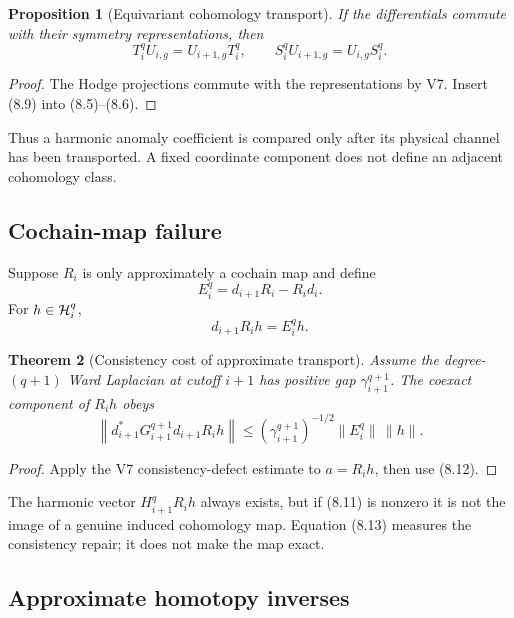 \documentclass[11pt]{article}
\newtheorem{theorem}{Theorem}[section]
\newtheorem{proposition}[theorem]{Proposition}
\theoremstyle{remark}
\begin{document}
\begin{proposition}[Equivariant cohomology transport]
\label{prop:v12v8-equivariant}
If the differentials commute with their symmetry representations,
then
\[
                         T_i^qU_{i,g}=U_{i+1,g}T_i^q,\qquad
                         S_i^qU_{i+1,g}=U_{i,g}S_i^q.        \tag{8.10}
\]
\end{proposition}

\begin{proof}
The Hodge projections commute with the representations by V7.
Insert (8.9) into (8.5)--(8.6).
\end{proof}

Thus a harmonic anomaly coefficient is compared only after its
physical channel has been transported.  A fixed coordinate component
does not define an adjacent cohomology class.

\subsection{Cochain-map failure}

Suppose \(R_i\) is only approximately a cochain map and define
\[
                              E_i^q=d_{i+1}R_i-R_id_i.        \tag{8.11}
\]
For \(h\in{\cal H}_i^q\),
\[
                              d_{i+1}R_ih=E_i^qh.            \tag{8.12}
\]

\begin{theorem}[Consistency cost of approximate transport]
\label{thm:v12v8-map-defect}
Assume the degree-\((q+1)\) Ward Laplacian at cutoff \(i+1\) has
positive gap \(\gamma_{i+1}^{q+1}\).  The coexact component of
\(R_ih\) obeys
\[
 \left\|
 d_{i+1}^*G_{i+1}^{q+1}d_{i+1}R_ih
 \right\|
 \le(\gamma_{i+1}^{q+1})^{-1/2}
       \|E_i^q\|\,\|h\|.                                    \tag{8.13}
\]
\end{theorem}

\begin{proof}
Apply the V7 consistency-defect estimate to \(a=R_ih\), then use
(8.12).
\end{proof}

The harmonic vector \(H_{i+1}^qR_ih\) always exists, but if (8.11) is
nonzero it is not the image of a genuine induced cohomology map.
Equation (8.13) measures the consistency repair; it does not make the
map exact.

\subsection{Approximate homotopy inverses}
\end{document}
